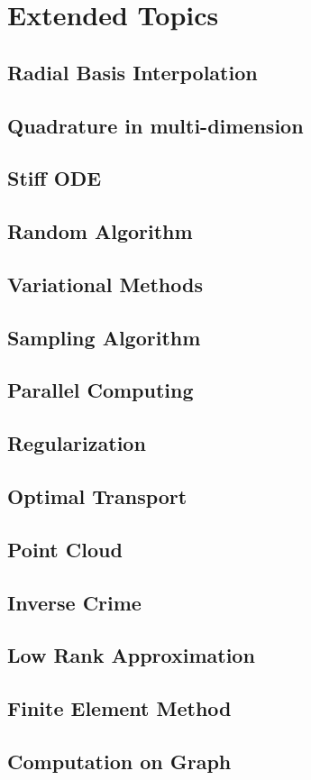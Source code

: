 \chapter{Extended Topics}

\section{Radial Basis Interpolation}

\section{Quadrature in multi-dimension}

\section{Stiff ODE}



\section{Random Algorithm}

\section{Variational Methods}

\section{Sampling Algorithm}

\section{Parallel Computing}

\section{Regularization}

\section{Optimal Transport}
\newpage
\section{Point Cloud}

\section{Inverse Crime}

\section{Low Rank Approximation}

\section{Finite Element Method}

\section{Computation on Graph}